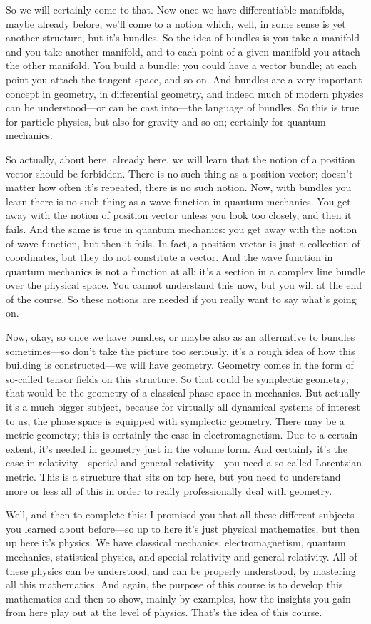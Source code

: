 So we will certainly come to that. Now once we have differentiable manifolds, maybe already before, we'll come to a notion which, well, in some sense is yet another structure, but it's bundles. So the idea of bundles is you take a manifold and you take another manifold, and to each point of a given manifold you attach the other manifold. You build a bundle: you could have a vector bundle; at each point you attach the tangent space, and so on. And bundles are a very important concept in geometry, in differential geometry, and indeed much of modern physics can be understood---or can be cast into---the language of bundles. So this is true for particle physics, but also for gravity and so on; certainly for quantum mechanics.

So actually, about here, already here, we will learn that the notion of a position vector should be forbidden. There is no such thing as a position vector; doesn't matter how often it's repeated, there is no such notion. Now, with bundles you learn there is no such thing as a wave function in quantum mechanics. You get away with the notion of position vector unless you look too closely, and then it fails. And the same is true in quantum mechanics: you get away with the notion of wave function, but then it fails. In fact, a position vector is just a collection of coordinates, but they do not constitute a vector. And the wave function in quantum mechanics is not a function at all; it's a section in a complex line bundle over the physical space. You cannot understand this now, but you will at the end of the course. So these notions are needed if you really want to say what's going on.

Now, okay, so once we have bundles, or maybe also as an alternative to bundles sometimes---so don't take the picture too seriously, it's a rough idea of how this building is constructed---we will have geometry. Geometry comes in the form of so-called tensor fields on this structure. So that could be symplectic geometry; that would be the geometry of a classical phase space in mechanics. But actually it's a much bigger subject, because for virtually all dynamical systems of interest to us, the phase space is equipped with symplectic geometry. There may be a metric geometry; this is certainly the case in electromagnetism. Due to a certain extent, it's needed in geometry just in the volume form. And certainly it's the case in relativity---special and general relativity---you need a so-called Lorentzian metric. This is a structure that sits on top here, but you need to understand more or less all of this in order to really professionally deal with geometry.

Well, and then to complete this: I promised you that all these different subjects you learned about before---so up to here it's just physical mathematics, but then up here it's physics. We have classical mechanics, electromagnetism, quantum mechanics, statistical physics, and special relativity and general relativity. All of these physics can be understood, and can be properly understood, by mastering all this mathematics. And again, the purpose of this course is to develop this mathematics and then to show, mainly by examples, how the insights you gain from here play out at the level of physics. That's the idea of this course.
